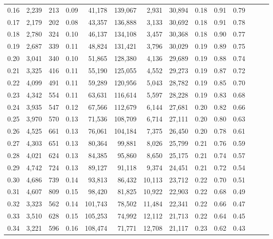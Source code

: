\begin{tabular}{rrrrrrrrrrrrrr}
0.16 &  2,239 &  213 &  0.09 &   41,178 &  139,067 &   2,931 &  30,894 &  0.18 &  0.91 &      0.79 \\
0.17 &  2,179 &  202 &  0.08 &   43,357 &  136,888 &   3,133 &  30,692 &  0.18 &  0.91 &      0.78 \\
0.18 &  2,780 &  324 &  0.10 &   46,137 &  134,108 &   3,457 &  30,368 &  0.18 &  0.90 &      0.77 \\
0.19 &  2,687 &  339 &  0.11 &   48,824 &  131,421 &   3,796 &  30,029 &  0.19 &  0.89 &      0.75 \\
0.20 &  3,041 &  340 &  0.10 &   51,865 &  128,380 &   4,136 &  29,689 &  0.19 &  0.88 &      0.74 \\
0.21 &  3,325 &  416 &  0.11 &   55,190 &  125,055 &   4,552 &  29,273 &  0.19 &  0.87 &      0.72 \\
0.22 &  4,099 &  491 &  0.11 &   59,289 &  120,956 &   5,043 &  28,782 &  0.19 &  0.85 &      0.70 \\
0.23 &  4,342 &  554 &  0.11 &   63,631 &  116,614 &   5,597 &  28,228 &  0.19 &  0.83 &      0.68 \\
0.24 &  3,935 &  547 &  0.12 &   67,566 &  112,679 &   6,144 &  27,681 &  0.20 &  0.82 &      0.66 \\
0.25 &  3,970 &  570 &  0.13 &   71,536 &  108,709 &   6,714 &  27,111 &  0.20 &  0.80 &      0.63 \\
0.26 &  4,525 &  661 &  0.13 &   76,061 &  104,184 &   7,375 &  26,450 &  0.20 &  0.78 &      0.61 \\
0.27 &  4,303 &  651 &  0.13 &   80,364 &   99,881 &   8,026 &  25,799 &  0.21 &  0.76 &      0.59 \\
0.28 &  4,021 &  624 &  0.13 &   84,385 &   95,860 &   8,650 &  25,175 &  0.21 &  0.74 &      0.57 \\
0.29 &  4,742 &  724 &  0.13 &   89,127 &   91,118 &   9,374 &  24,451 &  0.21 &  0.72 &      0.54 \\
0.30 &  4,686 &  739 &  0.14 &   93,813 &   86,432 &  10,113 &  23,712 &  0.22 &  0.70 &      0.51 \\
0.31 &  4,607 &  809 &  0.15 &   98,420 &   81,825 &  10,922 &  22,903 &  0.22 &  0.68 &      0.49 \\
0.32 &  3,323 &  562 &  0.14 &  101,743 &   78,502 &  11,484 &  22,341 &  0.22 &  0.66 &      0.47 \\
0.33 &  3,510 &  628 &  0.15 &  105,253 &   74,992 &  12,112 &  21,713 &  0.22 &  0.64 &      0.45 \\
0.34 &  3,221 &  596 &  0.16 &  108,474 &   71,771 &  12,708 &  21,117 &  0.23 &  0.62 &      0.43 \\

\end{tabular}
